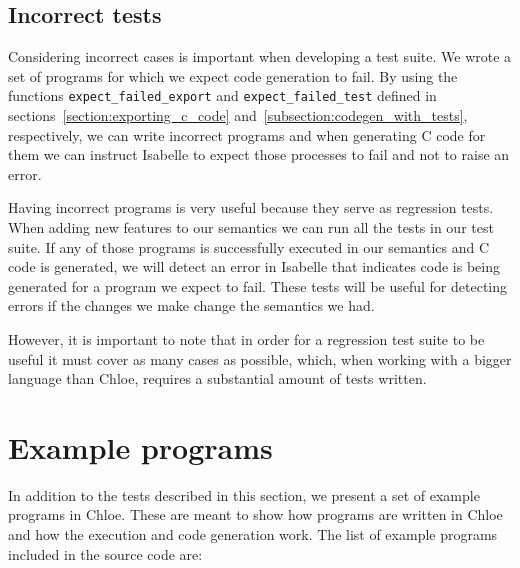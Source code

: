\subsection{Incorrect tests}

Considering incorrect cases is important when developing a test suite.
We wrote a set of programs for which we expect code generation to fail.
By using the functions \verb|expect_failed_export| and \verb|expect_failed_test| defined in sections~\ref{section:exporting_c_code} and~\ref{subsection:codegen_with_tests}, respectively, we can write incorrect programs and when generating C code for them we can instruct Isabelle to expect those processes to fail and not to raise an error.

Having incorrect programs is very useful because they serve as regression tests.
When adding new features to our semantics we can run all the tests in our test suite.
If any of those programs is successfully executed in our semantics and C code is generated, we will detect an error in Isabelle that indicates code is being generated for a program we expect to fail.
These tests will be useful for detecting errors if the changes we make change the semantics we had.

However, it is important to note that in order for a regression test suite to be useful it must cover as many cases as possible, which, when working with a bigger language than Chloe, requires a substantial amount of tests written.

\section{Example programs}

In addition to the tests described in this section, we present a set of example programs in Chloe.
These are meant to show how programs are written in Chloe and how the execution and code generation work.
The list of example programs included in the source code are:

